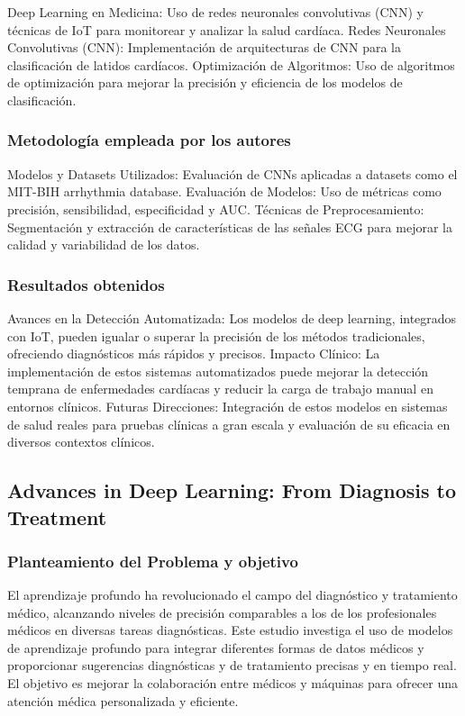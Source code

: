 Deep Learning en Medicina: Uso de redes neuronales convolutivas (CNN) y técnicas de IoT para monitorear y analizar la salud cardíaca.
Redes Neuronales Convolutivas (CNN): Implementación de arquitecturas de CNN para la clasificación de latidos cardíacos.
Optimización de Algoritmos: Uso de algoritmos de optimización para mejorar la precisión y eficiencia de los modelos de clasificación.

\subsubsection{Metodología empleada por los autores}

Modelos y Datasets Utilizados: Evaluación de CNNs aplicadas a datasets como el MIT-BIH arrhythmia database.
Evaluación de Modelos: Uso de métricas como precisión, sensibilidad, especificidad y AUC.
Técnicas de Preprocesamiento: Segmentación y extracción de características de las señales ECG para mejorar la calidad y variabilidad de los datos.

\subsubsection{Resultados obtenidos}

Avances en la Detección Automatizada: Los modelos de deep learning, integrados con IoT, pueden igualar o superar la precisión de los métodos tradicionales, ofreciendo diagnósticos más rápidos y precisos.
Impacto Clínico: La implementación de estos sistemas automatizados puede mejorar la detección temprana de enfermedades cardíacas y reducir la carga de trabajo manual en entornos clínicos.
Futuras Direcciones: Integración de estos modelos en sistemas de salud reales para pruebas clínicas a gran escala y evaluación de su eficacia en diversos contextos clínicos.


\subsection{Advances in Deep Learning: From Diagnosis to Treatment}

\subsubsection{Planteamiento del Problema y objetivo}

El aprendizaje profundo ha revolucionado el campo del diagnóstico y tratamiento médico, alcanzando niveles de precisión comparables a los de los profesionales médicos en diversas tareas diagnósticas. Este estudio investiga el uso de modelos de aprendizaje profundo para integrar diferentes formas de datos médicos y proporcionar sugerencias diagnósticas y de tratamiento precisas y en tiempo real. El objetivo es mejorar la colaboración entre médicos y máquinas para ofrecer una atención médica personalizada y eficiente.

